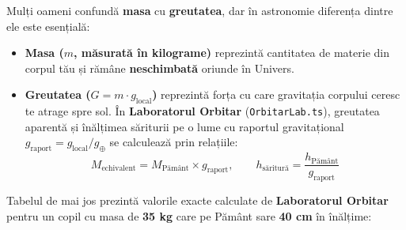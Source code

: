 Mulți oameni confundă \textbf{masa} cu \textbf{greutatea}, dar în astronomie diferența dintre ele este esențială:
\begin{itemize}[leftmargin=1.5em, itemsep=2pt]
  \item \textbf{Masa ($m$, măsurată în kilograme)} reprezintă cantitatea de materie din corpul tău și rămâne \textbf{neschimbată} oriunde în Univers.
  \item \textbf{Greutatea ($G = m \cdot g_{\text{local}}$)} reprezintă forța cu care gravitația corpului ceresc te atrage spre sol. În \textbf{Laboratorul Orbitar} (\texttt{OrbitarLab.ts}), greutatea aparentă și înălțimea săriturii pe o lume cu raportul gravitațional $g_{\text{raport}} = g_{\text{local}} / g_\oplus$ se calculează prin relațiile:
  \[
    M_{\text{echivalent}} = M_{\text{Pământ}} \times g_{\text{raport}}, \qquad h_{\text{săritură}} = \frac{h_{\text{Pământ}}}{g_{\text{raport}}}
  \]
\end{itemize}

Tabelul de mai jos prezintă valorile exacte calculate de \textbf{Laboratorul Orbitar} pentru un copil cu masa de \textbf{35 kg} care pe Pământ sare \textbf{40 cm} în înălțime:

